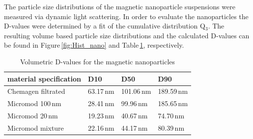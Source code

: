The particle size distributions of the magnetic nanoparticle suspensions were measured via dynamic light scattering. In order to evaluate the nanoparticles the D-values were determined by a fit of the cumulative distribution Q$_{3}$. The resulting volume based particle size distributions and the calculated D-values can be found in Figure\,\ref{fig:Hist_nano} and Table\,\ref{table:D_values}, respectively.

\begin{table}[h]
\centering
\caption[Volumetric D-values for the magnetic nanoparticles]{Volumetric D-values for the magnetic nanoparticles}
\label{table:D_values}
\begin{tabularx}{\textwidth}{XXXX}\hline
material specification & D10  & D50 & D90  \\
\hline\hline
Chemagen filtrated & 63.17\,nm & 101.06\,nm & 189.59\,nm \\
Micromod 100\,nm & 28.41\,nm & 99.96\,nm & 185.65\,nm \\
Micromod 20\,nm & 19.23\,nm & 40.67\,nm & 74.70\,nm \\
Micromod mixture & 22.16\,nm & 44.17\,nm & 80.39\,nm \\
\hline
\end{tabularx}
\end{table}  

